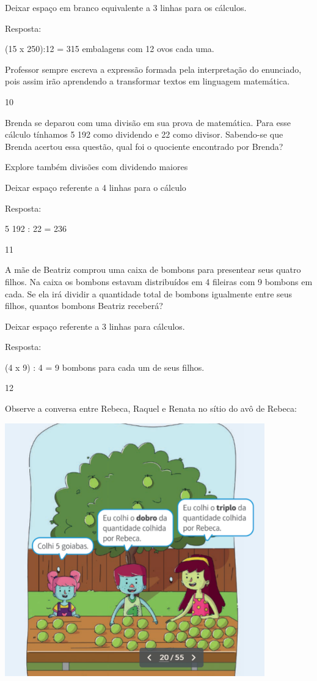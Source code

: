 Deixar espaço em branco equivalente a 3 linhas para os cálculos.

Resposta:

(15 x 250):12 = 315 embalagens com 12 ovos cada uma.

Professor sempre escreva a expressão formada pela interpretação do
enunciado, pois assim irão aprendendo a transformar textos em linguagem
matemática.

\num{10}

Brenda se deparou com uma divisão em sua prova de matemática. Para esse
cálculo tínhamos 5 192 como dividendo e 22 como divisor. Sabendo-se que
Brenda acertou essa questão, qual foi o quociente encontrado por Brenda?

Explore também divisões com dividendo maiores

Deixar espaço referente a 4 linhas para o cálculo

Resposta:

5 192 : 22 = 236

\num{11}

A mãe de Beatriz comprou uma caixa de bombons para presentear seus
quatro filhos. Na caixa os bombons estavam distribuídos em 4 fileiras
com 9 bombons em cada. Se ela irá dividir a quantidade total de bombons
igualmente entre seus filhos, quantos bombons Beatriz receberá?

Deixar espaço referente a 3 linhas para cálculos.

Resposta:

(4 x 9) : 4 = 9 bombons para cada um de seus filhos.

\num{12}

Observe a conversa entre Rebeca, Raquel e Renata no sítio do avô de
Rebeca:

\includegraphics[width=4.42538in,height=4.30871in]{media/image24.png}

